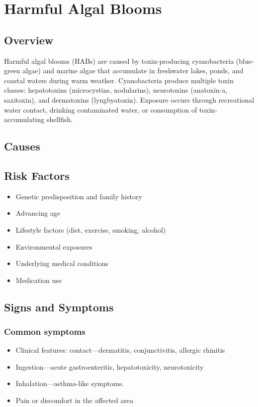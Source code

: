 \chapter{Harmful Algal Blooms}
\label{sec:Harmful Algal Blooms}

\section{Overview}
Harmful algal blooms (HABs) are caused by toxin-producing cyanobacteria (blue-green algae) and marine algae that accumulate in freshwater lakes, ponds, and coastal waters during warm weather. Cyanobacteria produce multiple toxin classes: hepatotoxins (microcystins, nodularins), neurotoxins (anatoxin-a, saxitoxin), and dermatoxins (lyngbyatoxin). Exposure occurs through recreational water contact, drinking contaminated water, or consumption of toxin-accumulating shellfish.
\section{Causes}
\section{Risk Factors}

\begin{itemize}[noitemsep]
  \item Genetic predisposition and family history
  \item Advancing age
  \item Lifestyle factors (diet, exercise, smoking, alcohol)
  \item Environmental exposures
  \item Underlying medical conditions
  \item Medication use
\end{itemize}
\section{Signs and Symptoms}

\subsection{Common symptoms}
\begin{itemize}[noitemsep]
  \item Clinical features: contact---dermatitis, conjunctivitis, allergic rhinitis
  \item Ingestion---acute gastroenteritis, hepatotoxicity, neurotoxicity
  \item Inhalation---asthma-like symptoms.
  \item Pain or discomfort in the affected area
  \end{itemize}

